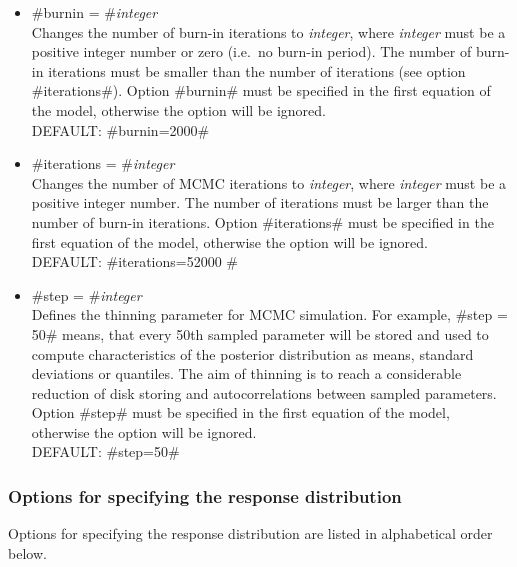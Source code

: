 \begin{itemize}
\item #burnin = #{\em integer } \\
Changes the number of burn-in iterations to {\em integer}, where
{\em integer} must be a positive integer number or zero (i.e.~no
burn-in period).
The number of burn-in iterations must be smaller than the number of iterations (see option #iterations#).
Option #burnin# must be specified in the first equation of the model, otherwise the option will be ignored. \\
DEFAULT: #burnin=2000#

\item #iterations = #{\em integer } \\
Changes the number of MCMC iterations to {\em integer}, where {\em
integer} must be a positive integer number. The number of
iterations must be larger than the
number of burn-in iterations.
Option #iterations# must be specified in the first equation of the model, otherwise the option will be ignored. \\
DEFAULT: #iterations=52000 #

\item #step = #{\em integer} \\
Defines the thinning parameter for MCMC simulation. For example,
#step = 50# means, that every 50th sampled parameter will be
stored and used to compute characteristics of the posterior
distribution as means, standard deviations or quantiles. The aim
of thinning is to reach a considerable reduction of disk storing
and autocorrelations between sampled parameters.
Option #step# must be specified in the first equation of the model, otherwise the option will be ignored. \\
DEFAULT: #step=50#

\end{itemize}

\subsubsection*{Options for specifying the response distribution}

Options for specifying the response distribution are listed in
alphabetical order below.



